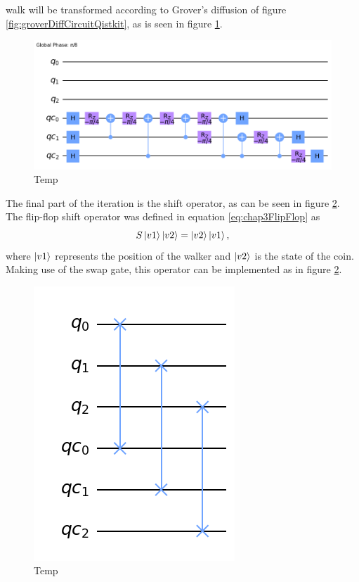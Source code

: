 \documentclass[../../dissertation.tex]{subfiles}
\begin{document}
walk will be transformed according to Grover's diffusion of figure
\ref{fig:groverDiffCircuitQistkit}, as is seen in figure
\ref{fig:coinedQWSearchDiffCircuitQistkit}. 
\begin{figure}[!h]
	\centering
	\includegraphics[scale=0.30]{img/Qiskit/CoinedQuantumWalk/Search/Circuits/CoinedSearchQiskitCircDiff_N3_M4_S5.png}
	\caption{Temp} 
	\label{fig:coinedQWSearchDiffCircuitQistkit}
\end{figure}
The final part of the iteration is the shift operator, as can be seen in figure
\ref{fig:coinedQWSearchShiftCircuitQistkit}. The flip-flop shift operator was
defined in equation \ref{eq:chap3FlipFlop} as
\begin{equation}
        S\ket{v1}\ket{v2} = \ket{v2}\ket{v1},
        \label{eq:chap4FlipFlop}
\end{equation}
where $\ket{v1}$ represents the position of the walker and $\ket{v2}$ is the
state of the coin. Making use of the swap gate, this operator can be
implemented as in figure \ref{fig:coinedQWSearchShiftCircuitQistkit}.
\begin{figure}[!h]
	\centering
	\includegraphics[scale=0.27]{img/Qiskit/CoinedQuantumWalk/Search/Circuits/CoinedSearchQiskitCircShift_N3_M4_S5.png}
	\caption{Temp} 
	\label{fig:coinedQWSearchShiftCircuitQistkit}
\end{figure}\par
\end{document}
